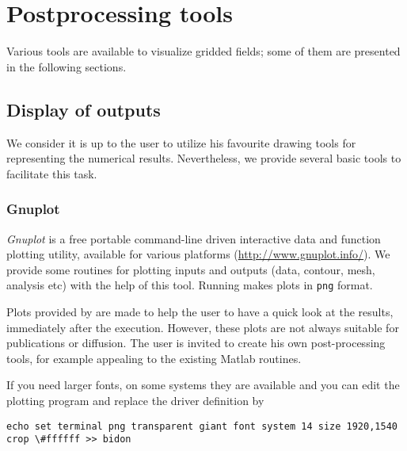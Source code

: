 \chapter{Postprocessing tools\label{chap:postprocessing}}

Various tools are available to visualize gridded fields; some of them are presented in the following sections.

\minitoc


\section{Display of outputs\label{visutools}}

We consider it is up to the user to utilize his favourite drawing tools for representing the numerical results. Nevertheless, we provide several basic tools to facilitate this task.

\subsection{Gnuplot\label{sec:visugnuplot}}

\textsl{Gnuplot} is a free portable command-line driven interactive data and function plotting utility, available for various platforms (\url{http://www.gnuplot.info/}). We provide some routines for plotting \diva inputs and outputs (data, contour, mesh, analysis etc) with the help of this tool. Running  makes plots in \texttt{png} format. 

\begin{tips}
Plots provided by \gnuplot are made to help the user to have a quick look at the results, immediately after the execution. However, these plots are not always suitable for publications or diffusion. The user is invited to create his own post-processing tools, for example appealing to the existing Matlab routines.
\end{tips}

\begin{tips}
If you need larger fonts, on some systems they are available and you can edit the plotting program 
and replace the driver definition by
\begin{tiny}
\begin{verbatim}
echo set terminal png transparent giant font system 14 size 1920,1540 crop \#ffffff >> bidon
\end{verbatim}
\end{tiny}
\end{tips}

